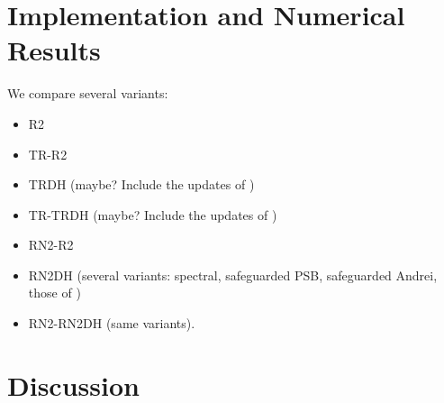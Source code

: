 \documentclass[smallextended]{svjour3}       %
\begin{document}
\section{Implementation and Numerical Results}%
\label{sec:numerical}

We compare several variants:
\begin{itemize}
  \item R2
  \item TR-R2
  \item TRDH (maybe? Include the updates of \citet{zhu-nazareth-wolkowicz-1999})
  \item TR-TRDH (maybe? Include the updates of \citet{zhu-nazareth-wolkowicz-1999})
  \item RN2-R2
  \item RN2DH (several variants: spectral, safeguarded PSB, safeguarded Andrei, those of \citet{zhu-nazareth-wolkowicz-1999})
  \item RN2-RN2DH (same variants).
\end{itemize}

\section{Discussion}%
\label{sec:discussion}





\end{document}
